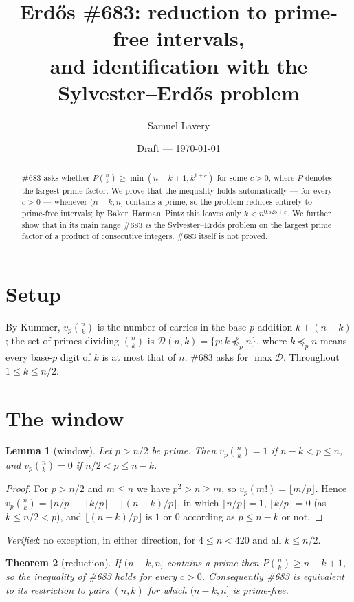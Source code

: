 \documentclass[11pt]{article}
\title{Erd\H{o}s \#683: reduction to prime-free intervals,\\ and identification with the
Sylvester--Erd\H{o}s problem}
\author{Samuel Lavery}
\date{Draft --- \today}
\newtheorem{theorem}{Theorem}
\newtheorem{lemma}[theorem]{Lemma}
\begin{document}
\maketitle

\begin{abstract}
\#683 asks whether $P\binom nk\ge\min(n-k+1,k^{1+c})$ for some $c>0$, where $P$ denotes the
largest prime factor.  We prove that the inequality holds automatically --- for every $c>0$
--- whenever $(n-k,n]$ contains a prime, so the problem reduces entirely to prime-free
intervals; by Baker--Harman--Pintz this leaves only $k<n^{0.525+\varepsilon}$.  We further
show that in its main range \#683 \emph{is} the Sylvester--Erd\H{o}s problem on the largest
prime factor of a product of consecutive integers.  \#683 itself is not proved.
\end{abstract}

\section{Setup}
By Kummer, $v_p\binom nk$ is the number of carries in the base-$p$ addition $k+(n-k)$; the
set of primes dividing $\binom nk$ is $\mathcal D(n,k)=\{p:k\not\preceq_p n\}$, where
$k\preceq_p n$ means every base-$p$ digit of $k$ is at most that of $n$.  \#683 asks for
$\max\mathcal D$.  Throughout $1\le k\le n/2$.

\section{The window}

\begin{lemma}[window]\label{lem:window}
Let $p>n/2$ be prime.  Then $v_p\binom nk=1$ if $n-k<p\le n$, and $v_p\binom nk=0$ if
$n/2<p\le n-k$.
\end{lemma}

\begin{proof}
For $p>n/2$ and $m\le n$ we have $p^2>n\ge m$, so $v_p(m!)=\lfloor m/p\rfloor$.  Hence
$v_p\binom nk=\lfloor n/p\rfloor-\lfloor k/p\rfloor-\lfloor(n-k)/p\rfloor$, in which
$\lfloor n/p\rfloor=1$, $\lfloor k/p\rfloor=0$ (as $k\le n/2<p$), and
$\lfloor(n-k)/p\rfloor$ is $1$ or $0$ according as $p\le n-k$ or not.
\end{proof}

\emph{Verified}: no exception, in either direction, for $4\le n<420$ and all $k\le n/2$.

\begin{theorem}[reduction]\label{thm:reduction}
If $(n-k,n]$ contains a prime then $P\binom nk\ge n-k+1$, so the inequality of \#683 holds
for every $c>0$.  Consequently \#683 is equivalent to its restriction to pairs $(n,k)$ for
which $(n-k,n]$ is prime-free.
\end{theorem}
\end{document}
